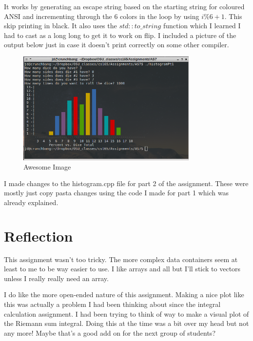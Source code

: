 \documentclass[a4paper,12pt]{article}
\begin{document}
It works by generating an escape string based on the starting string for coloured ANSI and incrementing through the 6 colors in the loop by using $i \% 6+1$.  This skip printing in black.  It also uses the $std::to\_string$ function which I learned I had to cast as a long long to get it to work on flip.  I included a picture of the output below just in case it doesn't print correctly on some other compiler. 

\begin{figure}[h!]
\centering
\includegraphics[width=0.8\textwidth]{hist}
\caption{Awesome Image}
\end{figure} 

\newpage

I made changes to the histogram.cpp file for part 2 of the assignment.  These were mostly just copy pasta changes using the code I made for part 1 which was already explained. 


\section{Reflection}

This assignment wasn't too tricky.  The more complex data containers seem at least to me to be way easier to use.  I like arrays and all but I'll stick to vectors unless I really really need an array. 

I do like the more open-ended nature of this assignment.  Making a nice plot like this was actually a problem I had been thinking about since the integral calculation assignment.  I had been trying to think of way to make a visual plot of the Riemann sum integral.  Doing this at the time was a bit over my head but not any more!  Maybe that's a good add on for the next group of students?\\
\end{document}
